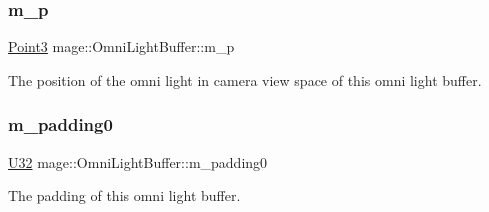 \subsubsection{\texorpdfstring{m\+\_\+p}{m\_p}}
{\footnotesize\ttfamily \hyperlink{structmage_1_1_point3}{Point3} mage\+::\+Omni\+Light\+Buffer\+::m\+\_\+p}

The position of the omni light in camera view space of this omni light buffer. \hypertarget{structmage_1_1_omni_light_buffer_af75a020722cd8eb37b91fe42a5b0ad5c}{}\label{structmage_1_1_omni_light_buffer_af75a020722cd8eb37b91fe42a5b0ad5c} 
\subsubsection{\texorpdfstring{m\+\_\+padding0}{m\_padding0}}
{\footnotesize\ttfamily \hyperlink{namespacemage_a41c104c036fba3756a74e19f793eeaa1}{U32} mage\+::\+Omni\+Light\+Buffer\+::m\+\_\+padding0}

The padding of this omni light buffer. 